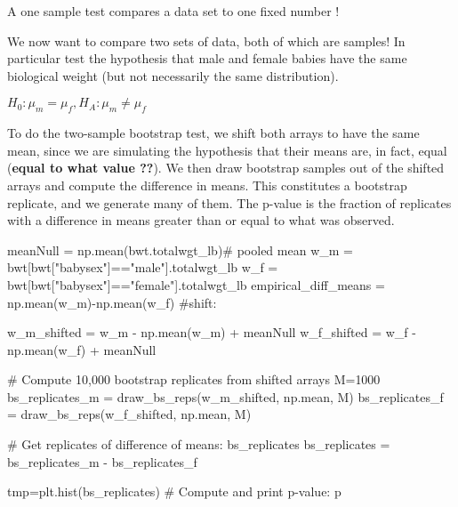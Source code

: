 \documentclass[
  letterpaper,
  DIV=11,
  numbers=noendperiod]{scrreprt}
\newenvironment{Shaded}{\begin{snugshade}}{\end{snugshade}}
\newcommand{\CommentTok}[1]{\textcolor[rgb]{0.37,0.37,0.37}{#1}}
\newcommand{\DecValTok}[1]{\textcolor[rgb]{0.68,0.00,0.00}{#1}}
\newcommand{\NormalTok}[1]{\textcolor[rgb]{0.00,0.23,0.31}{#1}}
\newcommand{\OperatorTok}[1]{\textcolor[rgb]{0.37,0.37,0.37}{#1}}
\newcommand{\StringTok}[1]{\textcolor[rgb]{0.13,0.47,0.30}{#1}}
\begin{document}
A one sample test compares a data set to one fixed number !

We now want to compare two sets of data, both of which are samples! In
particular test the hypothesis that male and female babies have the same
biological weight (but not necessarily the same distribution).

\(H_0: \mu_m = \mu_f, H_A: \mu_m \neq \mu_f\)

To do the two-sample bootstrap test, we shift both arrays to have the
same mean, since we are simulating the hypothesis that their means are,
in fact, equal (\textbf{equal to what value ??}). We then draw bootstrap
samples out of the shifted arrays and compute the difference in means.
This constitutes a bootstrap replicate, and we generate many of them.
The p-value is the fraction of replicates with a difference in means
greater than or equal to what was observed.

\begin{Shaded}
\begin{Highlighting}[]
\NormalTok{meanNull }\OperatorTok{=}\NormalTok{ np.mean(bwt.totalwgt\_lb)}\CommentTok{\# pooled mean}
\NormalTok{w\_m }\OperatorTok{=}\NormalTok{ bwt[bwt[}\StringTok{"babysex"}\NormalTok{]}\OperatorTok{==}\StringTok{"male"}\NormalTok{].totalwgt\_lb}
\NormalTok{w\_f }\OperatorTok{=}\NormalTok{ bwt[bwt[}\StringTok{"babysex"}\NormalTok{]}\OperatorTok{==}\StringTok{"female"}\NormalTok{].totalwgt\_lb}
\NormalTok{empirical\_diff\_means }\OperatorTok{=}\NormalTok{ np.mean(w\_m)}\OperatorTok{{-}}\NormalTok{np.mean(w\_f) }
\CommentTok{\#shift:}

\NormalTok{w\_m\_shifted }\OperatorTok{=}\NormalTok{ w\_m }\OperatorTok{{-}}\NormalTok{ np.mean(w\_m) }\OperatorTok{+}\NormalTok{ meanNull}
\NormalTok{w\_f\_shifted }\OperatorTok{=}\NormalTok{ w\_f }\OperatorTok{{-}}\NormalTok{ np.mean(w\_f) }\OperatorTok{+}\NormalTok{ meanNull}


\CommentTok{\# Compute 10,000 bootstrap replicates from shifted arrays}
\NormalTok{M}\OperatorTok{=}\DecValTok{1000}
\NormalTok{bs\_replicates\_m }\OperatorTok{=}\NormalTok{ draw\_bs\_reps(w\_m\_shifted, np.mean, M)}
\NormalTok{bs\_replicates\_f }\OperatorTok{=}\NormalTok{ draw\_bs\_reps(w\_f\_shifted, np.mean, M)}

\CommentTok{\# Get replicates of difference of means: bs\_replicates}
\NormalTok{bs\_replicates }\OperatorTok{=}\NormalTok{ bs\_replicates\_m }\OperatorTok{{-}}\NormalTok{ bs\_replicates\_f}

\NormalTok{tmp}\OperatorTok{=}\NormalTok{plt.hist(bs\_replicates)}
\CommentTok{\# Compute and print p{-}value: p}
\end{Highlighting}
\end{Shaded}
\end{document}
